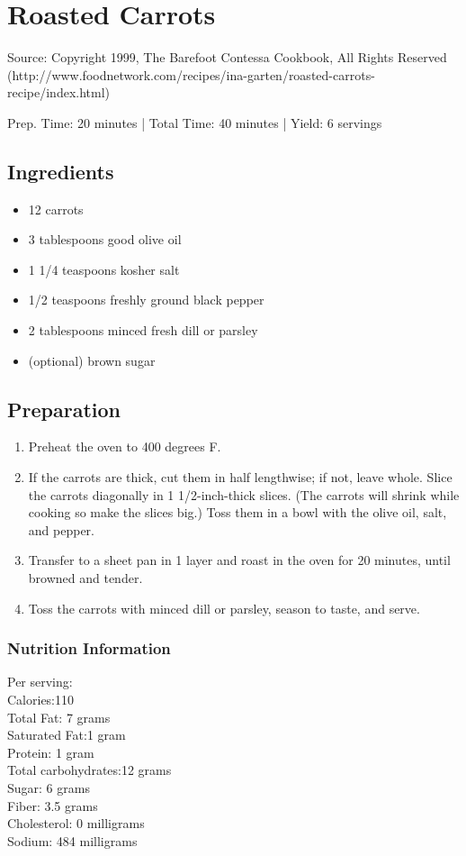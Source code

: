 \section{Roasted Carrots}

Source: Copyright 1999, The Barefoot Contessa Cookbook, All Rights Reserved (http://www.foodnetwork.com/recipes/ina-garten/roasted-carrots-recipe/index.html)

\begin{center}
Prep. Time: 20 minutes |
Total Time: 40 minutes | 
Yield: 6 servings
\end{center}

\subsection{Ingredients}
\begin{multicols}{2}
\begin{itemize}
    \item 12 carrots
    \item 3 tablespoons good olive oil
    \item 1 1/4 teaspoons kosher salt
    \item 1/2 teaspoons freshly ground black pepper
    \item 2 tablespoons minced fresh dill or parsley
    \item (optional) brown sugar
\end{itemize}
\end{multicols}

\subsection{Preparation}
\begin{enumerate}
    \item Preheat the oven to 400 degrees F.
    \item If the carrots are thick, cut them in half lengthwise; if not, leave whole. Slice the carrots diagonally in 1 1/2-inch-thick slices. (The carrots will shrink while cooking so make the slices big.) Toss them in a bowl with the olive oil, salt, and pepper.
    \item Transfer to a sheet pan in 1 layer and roast in the oven for 20 minutes, until browned and tender.
    \item Toss the carrots with minced dill or parsley, season to taste, and serve.
\end{enumerate}

\subsubsection{Nutrition Information}
Per serving:\\
Calories:110\\
Total Fat: 7 grams\\
Saturated Fat:1 gram\\
Protein: 1 gram\\
Total carbohydrates:12 grams\\
Sugar: 6 grams\\
Fiber: 3.5 grams\\
Cholesterol: 0 milligrams\\
Sodium: 484 milligrams
